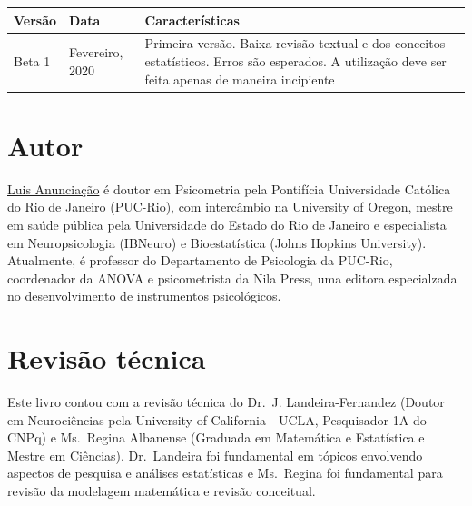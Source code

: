 \documentclass[
]{book}
\begin{document}
\begin{longtable}[]{@{}lll@{}}
\toprule
\begin{minipage}[b]{0.24\columnwidth}\raggedright
Versão\strut
\end{minipage} & \begin{minipage}[b]{0.34\columnwidth}\raggedright
Data\strut
\end{minipage} & \begin{minipage}[b]{0.34\columnwidth}\raggedright
Características\strut
\end{minipage}\tabularnewline
\midrule
\endhead
\begin{minipage}[t]{0.24\columnwidth}\raggedright
Beta 1\strut
\end{minipage} & \begin{minipage}[t]{0.34\columnwidth}\raggedright
Fevereiro, 2020\strut
\end{minipage} & \begin{minipage}[t]{0.34\columnwidth}\raggedright
Primeira versão. Baixa revisão textual e dos conceitos estatísticos. Erros são esperados. A utilização deve ser feita apenas de maneira incipiente\strut
\end{minipage}\tabularnewline
\bottomrule
\end{longtable}

\hypertarget{autor}{%
\section{Autor}\label{autor}}

\href{http://lattes.cnpq.br/3982200733248687}{Luis Anunciação} é doutor em Psicometria pela Pontifícia Universidade Católica do Rio de Janeiro (PUC-Rio), com intercâmbio na University of Oregon, mestre em saúde pública pela Universidade do Estado do Rio de Janeiro e especialista em Neuropsicologia (IBNeuro) e Bioestatística (Johns Hopkins University). Atualmente, é professor do Departamento de Psicologia da PUC-Rio, coordenador da ANOVA e psicometrista da Nila Press, uma editora especialzada no desenvolvimento de instrumentos psicológicos.

\hypertarget{revisuxe3o-tuxe9cnica}{%
\section{Revisão técnica}\label{revisuxe3o-tuxe9cnica}}

Este livro contou com a revisão técnica do Dr.~J. Landeira-Fernandez (Doutor em Neurociências pela University of California - UCLA, Pesquisador 1A do CNPq) e Ms.~Regina Albanense (Graduada em Matemática e Estatística e Mestre em Ciências). Dr.~Landeira foi fundamental em tópicos envolvendo aspectos de pesquisa e análises estatísticas e Ms.~Regina foi fundamental para revisão da modelagem matemática e revisão conceitual.
\end{document}
